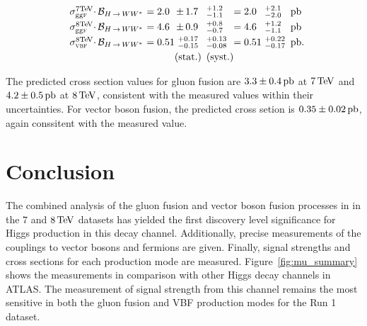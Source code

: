 \begin{equation}
\begin{array}{lllllll}
\np\sigma_{\scggF}^{7\!\TeV}{\!\CDOT}\mathcal{B}_{\HWW}\np&= 2.0 \np\no&{\PM}1.7            \no\!&^{+1.2}_{-1.1}  \np\no&=2.0 \np\no&\,\,^{+2.1}_{-2.0}   \np&\pb \nq\\ \clineskip
\np\sigma_{\scggF}^{8\!\TeV}{\!\CDOT}\mathcal{B}_{\HWW}\np&= 4.6 \np\no&{\PM}0.9            \no\!&^{+0.8}_{-0.7}  \np\no&=4.6 \np\no&\,\,^{+1.2}_{-1.1}    \np&\pb \nq\\ \clineskip
\np\sigma_{\scVX }^{8\!\TeV}{\!\CDOT}\mathcal{B}_{\HWW}\np&= 0.51\np\no&\,\,^{+0.17}_{-0.15}\no\!&^{+0.13}_{-0.08}\np\no&=0.51\np\no&\,\,^{+0.22}_{-0.17} \np&\pb.\nq\\ \clineskip
\np                                                       &      \np\no&\textrm{(stat.)}    \no\!&\textrm{(syst.)}\np\no
\end{array}
\label{eqn:xsec_vals}
\end{equation}

The predicted cross section values for gluon fusion are $3.3 \pm 0.4 \mbox{\,pb}$ at $7 \TeV$ and $4.2 \pm 0.5 \mbox{\,pb}$ at $8 \TeV$, consistent with the measured values within their uncertainties. For vector boson fusion, the predicted cross setion is $0.35 \pm 0.02 \mbox{\,pb}$, again conssitent with the measured value. 

\section{Conclusion}

The combined analysis of the gluon fusion and vector boson fusion processes in \HWWfull in the $7$ and $8 \TeV$ datasets has yielded the first discovery level significance for Higgs production in this decay channel. Additionally, precise measurements of the couplings to vector bosons and fermions are given. Finally, signal strengths and cross sections for each production mode are measured. Figure~\ref{fig:mu_summary} shows the \HWWfull measurements in comparison with other Higgs decay channels in ATLAS. The measurement of signal strength from this channel remains the most sensitive in both the gluon fusion and VBF production modes for the Run 1 dataset. 

